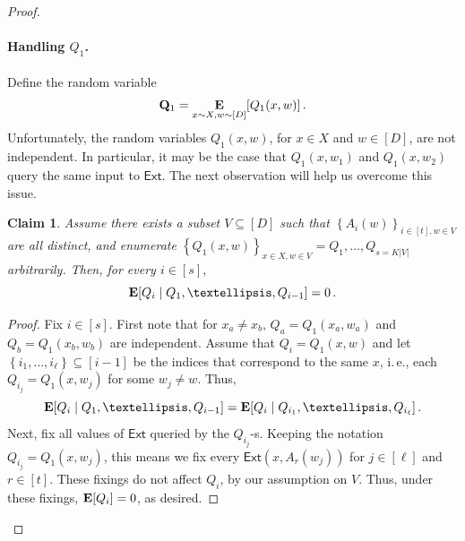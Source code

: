 \documentclass[11pt]{article}
\numberwithin{equation}{section}
\newtheorem{claim}[theorem]{Claim}
\theoremstyle{definition}
\theoremstyle{plain}
\newcommand{\ie}{i.\,e.}
\newcommand{\ext}{\mathsf{Ext}}
\newcommand{\adv}{A}
\newcommand{\set}[1]{\left\{{#1}\right\}}
\newcommand{\E}{\mathop{\bf E\/}}
\begin{document}
\begin{proof}
\paragraph{Handling $Q_1$.} Define the random variable
\[
\mathbf{Q}_1 = \E_{x \sim X,w \sim [D]}[Q_{1}(x,w)]\,.
\]
Unfortunately, the random variables $Q_{1}(x,w)$, 
for $x \in X$ and
$w \in [D]$, are not independent. In particular, it may be the case that $Q_1(x,w_1)$
and $Q_1(x,w_2)$ query the same input to $\ext$.
The next observation will help us overcome
this issue.
\begin{claim}\label{claim:partition}
Assume there exists a subset $V \subseteq [D]$ such that 
$\set{\adv_{i}(w)}_{i \in [t],w \in V}$ are all distinct, and enumerate
$\set{Q_1(x,w)}_{x \in X,w \in V} = Q_{1},\ldots,Q_{s = K|V|}$ arbitrarily. Then, for every $i \in [s]$,
\[\E[Q_{i} \mid Q_{1},\ldots,Q_{i-1}]=0\,.\]
\end{claim}
\begin{proof}
Fix $i \in [s]$.
First note that for $x_a \neq x_b$, $Q_{a} = Q_1(x_a,w_a)$ and $Q_{b} = Q_1(x_b,w_b)$ 
are independent. Assume that $Q_i = Q_{1}(x,w)$
and let $\set{i_1,\ldots,i_\ell} \subseteq [i-1]$ be the indices that correspond to the same $x$,
\ie, each $Q_{i_j} = Q_{1}(x,w_j)$ for some $w_j \neq w$. Thus,
\[\E[Q_{i} \mid Q_{1},\ldots,Q_{i-1}]=\E[Q_{i} \mid Q_{i_1},\ldots,Q_{i_\ell}]\,.\]
Next, fix all values of $\ext$ queried by the $Q_{i_j}$-s. Keeping the notation
$Q_{i_j} = Q_1(x,w_j)$, this means we fix every
$\ext(x,\adv_{r}(w_j))$ for $j \in [\ell]$ and $r \in [t]$. These fixings do not
affect $Q_i$, by our assumption on $V$. Thus, under these fixings, $\E[Q_i] = 0$, 
as desired.
\end{proof}


\end{proof}
\end{document}
